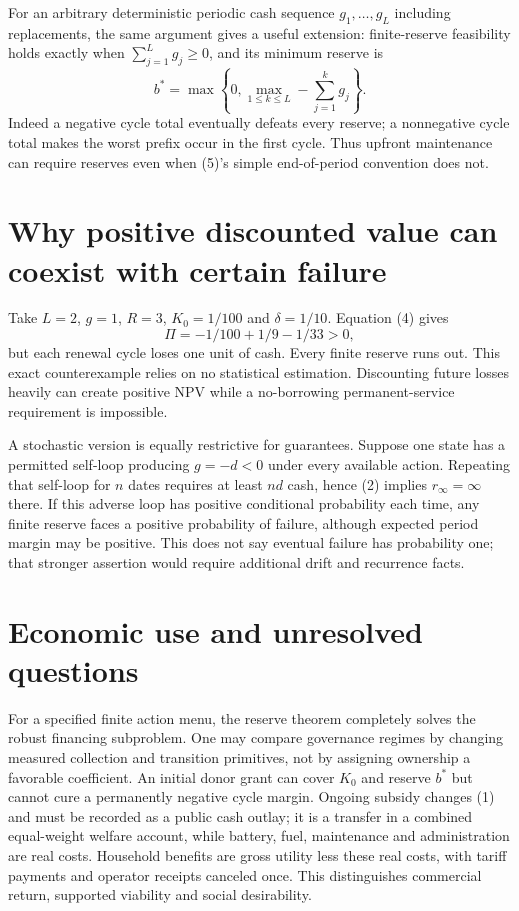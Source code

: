 \documentclass[11pt]{article}
\begin{document}
For an arbitrary deterministic periodic cash sequence
$g_1,\ldots,g_L$ including replacements, the same argument gives a useful
extension: finite-reserve feasibility holds exactly when
$\sum_{j=1}^L g_j\geq0$, and its minimum reserve is
\[
 b^*=\max\left\{0,\max_{1\leq k\leq L}
                          -\sum_{j=1}^k g_j\right\}.         \tag{6}
\]
Indeed a negative cycle total eventually defeats every reserve; a
nonnegative cycle total makes the worst prefix occur in the first cycle.
Thus upfront maintenance can require reserves even when (5)'s simple
end-of-period convention does not.

\section{Why positive discounted value can coexist with certain failure}
Take $L=2$, $g=1$, $R=3$, $K_0=1/100$ and $\delta=1/10$.
Equation (4) gives
\[
 \Pi=-1/100+1/9-1/33>0,
\]
but each renewal cycle loses one unit of cash. Every finite reserve runs
out. This exact counterexample relies on no statistical estimation.
Discounting future losses heavily can create positive NPV while a
no-borrowing permanent-service requirement is impossible.

A stochastic version is equally restrictive for guarantees. Suppose one
state has a permitted self-loop producing $g=-d<0$ under every available
action. Repeating that self-loop for $n$ dates requires at least $nd$
cash, hence (2) implies $r_\infty=\infty$ there. If this adverse loop has
positive conditional probability each time, any finite reserve faces a
positive probability of failure, although expected period margin may be
positive. This does not say eventual failure has probability one; that
stronger assertion would require additional drift and recurrence facts.

\section{Economic use and unresolved questions}
For a specified finite action menu, the reserve theorem completely solves
the robust financing subproblem. One may compare governance regimes by
changing measured collection and transition primitives, not by assigning
ownership a favorable coefficient. An initial donor grant can cover $K_0$
and reserve $b^*$ but cannot cure a permanently negative cycle margin.
Ongoing subsidy changes (1) and must be recorded as a public cash outlay;
it is a transfer in a combined equal-weight welfare account, while battery,
fuel, maintenance and administration are real costs. Household benefits
are gross utility less these real costs, with tariff payments and operator
receipts canceled once. This distinguishes commercial return, supported
viability and social desirability.
\end{document}
